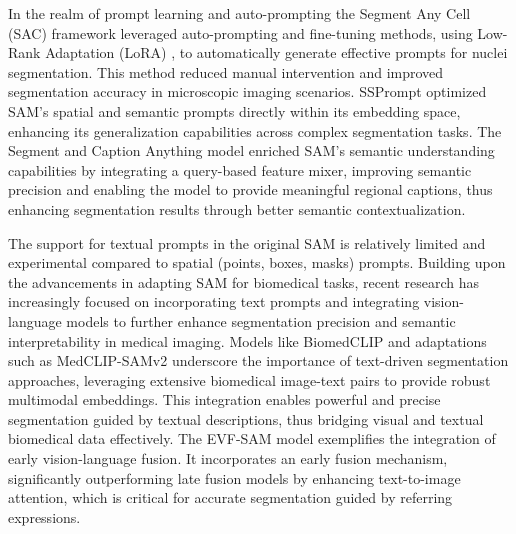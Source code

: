 \documentclass[./dissertation.tex]{subfiles}
\begin{document}
In the realm of prompt learning and auto-prompting the Segment Any Cell (SAC) \cite{na2024segment} framework leveraged auto-prompting and fine-tuning methods, using Low-Rank Adaptation (LoRA) \cite{hu2022lora}, to automatically generate effective prompts for nuclei segmentation. This method reduced manual intervention and improved segmentation accuracy in microscopic imaging scenarios. SSPrompt \cite{huang2024learning} optimized SAM's spatial and semantic prompts directly within its embedding space, enhancing its generalization capabilities across complex segmentation tasks. The Segment and Caption Anything \cite{huang2024segment} model enriched SAM's semantic understanding capabilities by integrating a query-based feature mixer, improving semantic precision and enabling the model to provide meaningful regional captions, thus enhancing segmentation results through better semantic contextualization.




The support for textual prompts in the original SAM is relatively limited and experimental compared to spatial (points, boxes, masks) prompts. Building upon the advancements in adapting SAM for biomedical tasks, recent research has increasingly focused on incorporating text prompts and integrating vision-language models to further enhance segmentation precision and semantic interpretability in medical imaging. Models like BiomedCLIP \cite{zhang2023biomedclip} and adaptations such as MedCLIP-SAMv2 \cite{koleilat2024medclipsamv2, koleilat2024medclip} underscore the importance of text-driven segmentation approaches, leveraging extensive biomedical image-text pairs to provide robust multimodal embeddings. This integration enables powerful and precise segmentation guided by textual descriptions, thus bridging visual and textual biomedical data effectively. The EVF-SAM \cite{zhang2024evf} model exemplifies the integration of early vision-language fusion. It incorporates an early fusion mechanism, significantly outperforming late fusion models by enhancing text-to-image attention, which is critical for accurate segmentation guided by referring expressions.
\end{document}
